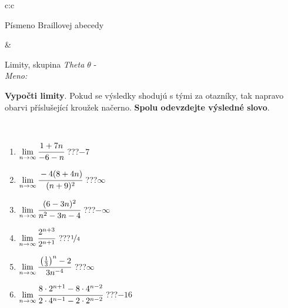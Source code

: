 \documentclass[10pt]{report}
\begin{document}
\begin{tabular}{c:c}
\begin{minipage}[c][104.5mm][t]{0.5\linewidth}
\begin{center}
\begin{minipage}{0.20\linewidth}
\begin{center}
{\small Písmeno Braillovej abecedy}
\end{center}
\end{minipage}
\end{center}
\end{minipage}
&
\begin{minipage}[c][104.5mm][t]{0.5\linewidth}
\begin{center}
\vspace{7mm}
{\huge Limity, skupina \textit{Theta $\theta$} -}\\[5mm]
\textit{Meno:}\phantom{xxxxxxxxxxxxxxxxxxxxxxxxxxxxxxxxxxxxxxxxxxxxxxxxxxxxxxxxxxxxxxxxx}\\[5mm]
\begin{minipage}{0.95\linewidth}
\begin{center}
\textbf{Vypočti limity}. Pokud se výsledky shodujú s tými za otazníky, tak napravo\\obarvi příslušející kroužek načerno. \textbf{Spolu odevzdejte výsledné slovo}.
\end{center}
\end{minipage}
\\[1mm]
\begin{minipage}{0.79\linewidth}
\begin{center}
\begin{varwidth}{\linewidth}
\begin{enumerate}
\normalsize
\item $\lim\limits_{n\to\infty}\cfrac{1+7n}{-6-n}$\quad \dotfill\; ???\;\dotfill \quad $-7$
\item $\lim\limits_{n\to\infty}\cfrac{-4(8+4n)}{(n+9)^2}$\quad \dotfill\; ???\;\dotfill \quad $\infty$
\item $\lim\limits_{n\to\infty}\cfrac{(6-3n)^2}{n^2-3n-4}$\quad \dotfill\; ???\;\dotfill \quad $-\infty$
\item $\lim\limits_{n\to\infty}\cfrac{2^{n+3}}{2^{n+1}}$\quad \dotfill\; ???\;\dotfill \quad $\nicefrac{1}{4}$
\item $\lim\limits_{n\to\infty}\cfrac{\left(\frac{1}{3}\right)^n -2}{3n^{-4}}$\quad \dotfill\; ???\;\dotfill \quad $\infty$
\item $\lim\limits_{n\to\infty}\cfrac{8\cdot 2^{n+1}-8\cdot 4^{n-2}}{2\cdot 4^{n-1}-2\cdot 2^{n-2}}$\quad \dotfill\; ???\;\dotfill \quad $-16$
\end{enumerate}
\end{varwidth}
\end{center}
\end{minipage}
\begin{minipage}{0.20\linewidth}

\end{minipage}
\end{center}
\end{minipage}
\end{tabular}
\end{document}
